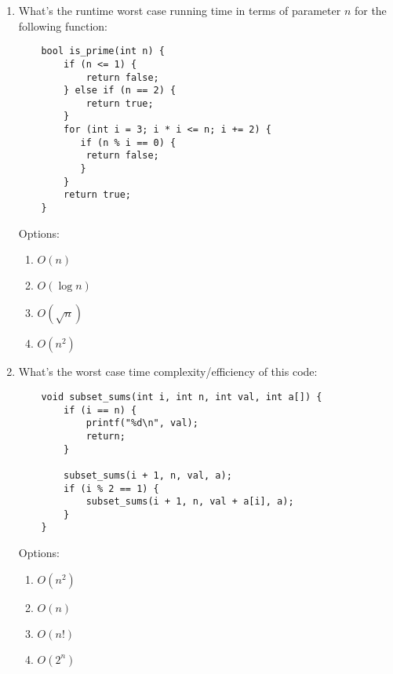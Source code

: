 \documentclass{article}
\begin{document}
\begin{enumerate}
    
    \item What’s the runtime worst case running time in terms of parameter \( n \) for the following function:
    \begin{lstlisting}
    bool is_prime(int n) {
        if (n <= 1) {
            return false;
        } else if (n == 2) {
            return true;
        }
        for (int i = 3; i * i <= n; i += 2) {
           if (n % i == 0) {
            return false;
           }
        }
        return true;
    }
    \end{lstlisting}
    Options:
    \begin{enumerate}[label=\alph*.]
        \item \( O(n) \)
        \item \( O(\log n) \)
        \item \( O(\sqrt{n}) \) \hl{\checkmark}
        \item \( O(n^2) \)
    \end{enumerate}

    \item What’s the worst case time complexity/efficiency of this code:
    \begin{lstlisting}
    void subset_sums(int i, int n, int val, int a[]) {
        if (i == n) {
            printf("%d\n", val);
            return;
        }
        
        subset_sums(i + 1, n, val, a);
        if (i % 2 == 1) {
            subset_sums(i + 1, n, val + a[i], a);
        }
    }
    \end{lstlisting}
    Options:
    \begin{enumerate}[label=\alph*.]
        \item \( O(n^2) \)
        \item \( O(n) \)
        \item \( O(n!) \)
        \item \( O(2^n) \) \hl{\checkmark}
    \end{enumerate}

    \newpage


\end{enumerate}
\end{document}
